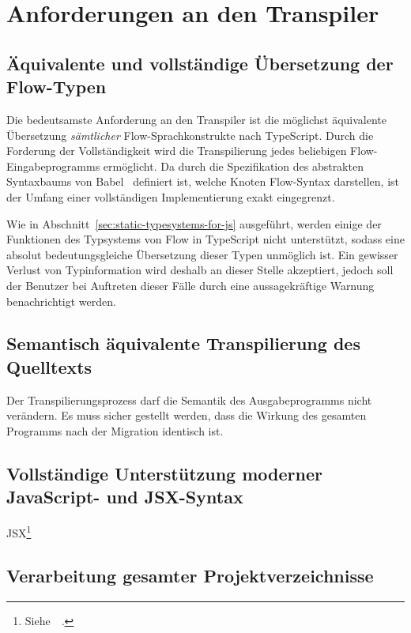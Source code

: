 \section{Anforderungen an den Transpiler}

\subsection{Äquivalente und vollständige Übersetzung der Flow-Typen}
\label{subsection:requirement:correct-translation}

Die bedeutsamste Anforderung an den Transpiler ist die möglichst äquivalente Übersetzung \emph{sämtlicher} Flow-Sprachkonstrukte nach TypeScript. Durch die Forderung der Vollständigkeit wird die Transpilierung jedes beliebigen Flow-Eingabeprogramms ermöglicht. Da durch die Spezifikation des abstrakten Syntaxbaums von Babel~\autocite{BABEL:PARSER_SPEC} definiert ist, welche Knoten Flow-Syntax darstellen, ist der Umfang einer vollständigen Implementierung exakt eingegrenzt.

Wie in Abschnitt~\ref{sec:static-typesystems-for-js} ausgeführt, werden einige der Funktionen des Typsystems von Flow in TypeScript nicht unterstützt, sodass eine absolut bedeutungsgleiche Übersetzung dieser Typen unmöglich ist. Ein gewisser Verlust von Typinformation wird deshalb an dieser Stelle akzeptiert, jedoch soll der Benutzer bei Auftreten dieser Fälle durch eine aussagekräftige Warnung benachrichtigt werden.

\subsection{Semantisch äquivalente Transpilierung des Quelltexts}
\label{subsection:requirement:semantic-equivalence}

Der Transpilierungsprozess darf die Semantik des Ausgabeprogramms nicht verändern. Es muss sicher gestellt werden, dass die Wirkung des gesamten Programms nach der Migration identisch ist.

\subsection{Vollständige Unterstützung moderner JavaScript- und JSX-Syntax}
\label{subsection:requirement:modern-js-support}



JSX\footnote{Siehe~~\autocite{SOFTWARE:JSX}.}

\subsection{Verarbeitung gesamter Projektverzeichnisse}
\label{subsection:requirement:batch-processing}

